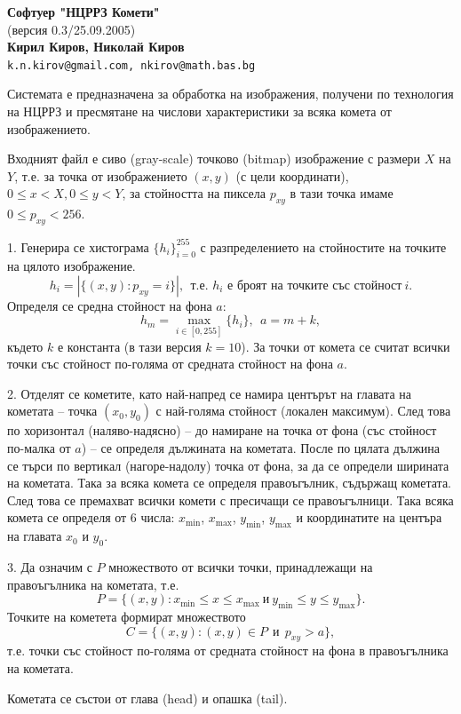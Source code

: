 \documentclass[12pt]{article}
\begin{document}
\begin{center}
\textbf{\Large Софтуер "НЦРРЗ Комети"}\\[10pt]
 (версия 0.3/25.09.2005)\\[10pt]
 \textbf{Кирил Киров, Николай Киров}\\
 \verb|k.n.kirov@gmail.com, nkirov@math.bas.bg|
\end{center}

 Системата е предназначена за обработка на изображения, получени по технология на НЦРРЗ и
 пресмятане на числови характеристики за всяка комета от
 изображението.

 Входният файл е сиво (gray-scale) точково (bitmap) изображение с размери $X$ на $Y$,
 т.е. за точка от изображението $(x,y)$ (с цели координати),
 $0\leq x < X, 0\leq y < Y$, за стойността на пиксела $p_{xy}$ в тази точка
 имаме $0\le p_{xy} < 256$.

1. Генерира се хистограма $\{h_i\}_{i=0}^{255}$ с разпределението на
стойностите на точките на цялото изображение.
$$
 h_i = | \{(x,y):  p_{xy} = i \} |,\ \ \mbox{т.е. $h_i$ е броят на точките със стойност} \ i.
$$
Определя се средна стойност на фона $a$:
$$
 h_m = \max_{i \in [0,255]} \{h_i\}, \ \ a =  m + k,
$$
където $k$ е константа (в тази версия $k = 10$). За точки от комета
се считат всички точки със стойност по-голяма от средната стойност
на фона $a$.

2. Отделят се кометите, като най-напред се намира центърът на
главата на кометата -- точка $(x_0, y_0)$ с най-голяма стойност
(локален
максимум). След това по хоризон\-тал (наляво-надясно) --
до намиране на точка от фона (със стойност по-малка от $a$) --
се определя дължината на кометата.
После по цялата дължина се търси по вертикал
(нагоре-надолу) точка от фона, за да се определи ширината на кометата.
Така за всяка комета се
определя правоъгълник, съдържащ кометата. След това се премахват
всички комети с пресичащи се право\-ъгъл\-ници. Така всяка комета се
определя от 6 числа: $x_{\min}$, $x_{\max}$, $y_{\min}$,
$y_{\max}$ и координатите на центъра на главата $x_0$ и $y_0$.

3. Да означим с $P$ множеството от всички точки,
 принадлежащи на правоъгълника на кометата, т.е.
$$
 P = \{ (x,y): x_{\min} \leq x \le x_{\max} \ \mbox{и}\
 y_{\min} \leq y \le y_{\max} \}.
$$
Точките на кометета формират множеството
$$
  C = \{ (x,y): (x,y) \in P \ \ \mbox{и}\ \ p_{xy} > a \},
$$
 т.е. точки със стойност по-голяма от средната стойност
 на фона в правоъгълника на кометата.

Кометата се състои от глава (head) и опашка (tail).
\end{document}
